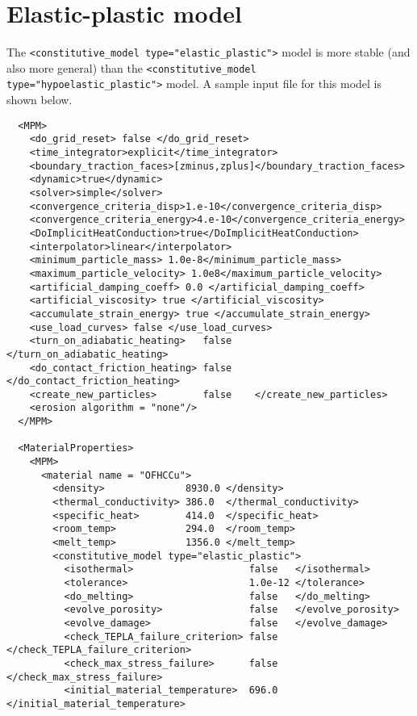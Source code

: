   \section{Elastic-plastic model}
  The \verb|<constitutive_model type="elastic_plastic">| model is more stable
  (and also more general)
  than the \verb|<constitutive_model type="hypoelastic_plastic">| model.  A
  sample input file for this model is shown below.
  \lstset{language=XML}
  \begin{lstlisting}
  <MPM>
    <do_grid_reset> false </do_grid_reset>
    <time_integrator>explicit</time_integrator>
    <boundary_traction_faces>[zminus,zplus]</boundary_traction_faces> 
    <dynamic>true</dynamic>
    <solver>simple</solver>
    <convergence_criteria_disp>1.e-10</convergence_criteria_disp>
    <convergence_criteria_energy>4.e-10</convergence_criteria_energy>
    <DoImplicitHeatConduction>true</DoImplicitHeatConduction>
    <interpolator>linear</interpolator>
    <minimum_particle_mass> 1.0e-8</minimum_particle_mass>
    <maximum_particle_velocity> 1.0e8</maximum_particle_velocity>
    <artificial_damping_coeff> 0.0 </artificial_damping_coeff>
    <artificial_viscosity> true </artificial_viscosity>
    <accumulate_strain_energy> true </accumulate_strain_energy>
    <use_load_curves> false </use_load_curves>
    <turn_on_adiabatic_heating>   false    </turn_on_adiabatic_heating>
    <do_contact_friction_heating> false    </do_contact_friction_heating>
    <create_new_particles>        false    </create_new_particles>
    <erosion algorithm = "none"/>
  </MPM>

  <MaterialProperties>
    <MPM>
      <material name = "OFHCCu">
        <density>              8930.0 </density>
        <thermal_conductivity> 386.0  </thermal_conductivity>
        <specific_heat>        414.0  </specific_heat>
        <room_temp>            294.0  </room_temp>
        <melt_temp>            1356.0 </melt_temp>
        <constitutive_model type="elastic_plastic">
          <isothermal>                    false   </isothermal>
          <tolerance>                     1.0e-12 </tolerance>
          <do_melting>                    false   </do_melting>
          <evolve_porosity>               false   </evolve_porosity>
          <evolve_damage>                 false   </evolve_damage>
          <check_TEPLA_failure_criterion> false   </check_TEPLA_failure_criterion>
          <check_max_stress_failure>      false   </check_max_stress_failure>
          <initial_material_temperature>  696.0   </initial_material_temperature>
          

\end{lstlisting}
